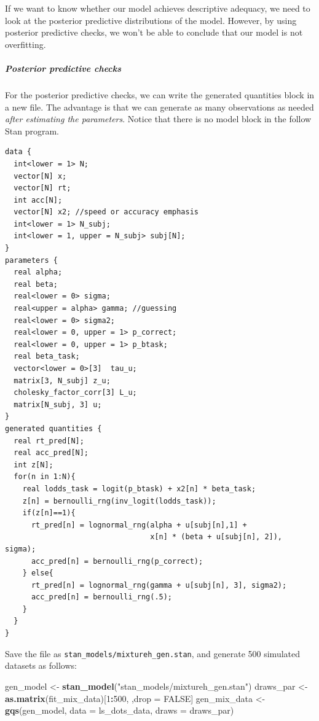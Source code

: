 \documentclass[12pt,]{krantz}
\newenvironment{Shaded}{\begin{snugshade}}{\end{snugshade}}
\newcommand{\KeywordTok}[1]{\textcolor[rgb]{0.13,0.29,0.53}{\textbf{#1}}}
\newcommand{\DataTypeTok}[1]{\textcolor[rgb]{0.13,0.29,0.53}{#1}}
\newcommand{\DecValTok}[1]{\textcolor[rgb]{0.00,0.00,0.81}{#1}}
\newcommand{\StringTok}[1]{\textcolor[rgb]{0.31,0.60,0.02}{#1}}
\newcommand{\OtherTok}[1]{\textcolor[rgb]{0.56,0.35,0.01}{#1}}
\newcommand{\OperatorTok}[1]{\textcolor[rgb]{0.81,0.36,0.00}{\textbf{#1}}}
\newcommand{\NormalTok}[1]{#1}
\let\oldsubparagraph\subparagraph
\renewcommand{\subparagraph}[1]{\oldsubparagraph{#1}\mbox{}}
\theoremstyle{definition}
\theoremstyle{definition}
\theoremstyle{definition}
\theoremstyle{remark}
\begin{document}
If we want to know whether our model achieves descriptive adequacy, we
need to look at the posterior predictive distributions of the model.
However, by using posterior predictive checks, we won't be able to
conclude that our model is not overfitting.

\subparagraph{Posterior predictive
checks}\label{posterior-predictive-checks}

For the posterior predictive checks, we can write the generated
quantities block in a new file. The advantage is that we can generate as
many observations as needed \emph{after estimating the parameters}.
Notice that there is no model block in the follow Stan program.

\begin{verbatim}
data {
  int<lower = 1> N;
  vector[N] x;
  vector[N] rt;
  int acc[N];
  vector[N] x2; //speed or accuracy emphasis
  int<lower = 1> N_subj;
  int<lower = 1, upper = N_subj> subj[N];
}
parameters {
  real alpha;
  real beta;
  real<lower = 0> sigma;
  real<upper = alpha> gamma; //guessing
  real<lower = 0> sigma2;
  real<lower = 0, upper = 1> p_correct;
  real<lower = 0, upper = 1> p_btask;
  real beta_task;
  vector<lower = 0>[3]  tau_u;   
  matrix[3, N_subj] z_u;
  cholesky_factor_corr[3] L_u;
  matrix[N_subj, 3] u;
}
generated quantities {
  real rt_pred[N];
  real acc_pred[N];
  int z[N];
  for(n in 1:N){
    real lodds_task = logit(p_btask) + x2[n] * beta_task;
    z[n] = bernoulli_rng(inv_logit(lodds_task));
    if(z[n]==1){
      rt_pred[n] = lognormal_rng(alpha + u[subj[n],1] +
                                 x[n] * (beta + u[subj[n], 2]), sigma);
      acc_pred[n] = bernoulli_rng(p_correct);
    } else{
      rt_pred[n] = lognormal_rng(gamma + u[subj[n], 3], sigma2);
      acc_pred[n] = bernoulli_rng(.5);
    }
  }
}
\end{verbatim}

Save the file as \texttt{stan\_models/mixtureh\_gen.stan}, and generate
500 simulated datasets as follows:

\begin{Shaded}
\begin{Highlighting}[]
\NormalTok{gen_model <-}\StringTok{ }\KeywordTok{stan_model}\NormalTok{(}\StringTok{"stan_models/mixtureh_gen.stan"}\NormalTok{)}
\NormalTok{draws_par <-}\StringTok{ }\KeywordTok{as.matrix}\NormalTok{(fit_mix_data)[}\DecValTok{1}\OperatorTok{:}\DecValTok{500}\NormalTok{, ,drop =}\StringTok{ }\OtherTok{FALSE}\NormalTok{]}
\NormalTok{gen_mix_data <-}\StringTok{ }\KeywordTok{gqs}\NormalTok{(gen_model,}
                    \DataTypeTok{data =}\NormalTok{ ls_dots_data,}
                    \DataTypeTok{draws =}\NormalTok{ draws_par)}
\end{Highlighting}
\end{Shaded}
\end{document}
